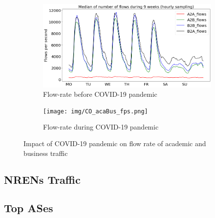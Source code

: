 \documentclass[10pt, journal, letterpaper]{IEEEtran}
\newcommand\linearFigSze{0.48}
\begin{document}
\begin{figure}
    \begin{subfigure}{\linearFigSze\textwidth}
          \centering
          \includegraphics[width=\columnwidth]{img/BCO_acaBus_fps.png}
          \caption{Flow-rate before COVID-19 pandemic}
          \label{fig:BCO_acaBus_fps}
    \end{subfigure}
    \begin{subfigure}{\linearFigSze\textwidth}
          \centering
          \texttt{[image: img/CO\_acaBus\_fps.png]}
          \caption{Flow-rate during COVID-19 pandemic}
          \label{fig:CO_acaBus_fps}
    \end{subfigure}
    \caption{Impact of COVID-19 pandemic on flow rate of academic and business traffic}
    \label{fig:flowrate_acaBus_BCO_CO}
\end{figure}
\subsection{NRENs Traffic}

\subsection{Top ASes}
\end{document}
